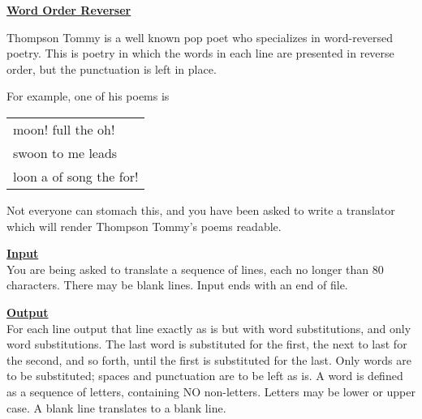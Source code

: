 \documentclass[12pt]{article}
\begin{document}
\newcommand{\problem}[1]{\underline{\Large \bf #1}}
\renewcommand{\section}[1]{\bigskip\underline{\bf #1}\\}
\newcommand{\header}[1]{\underline{\bf #1}}
\setlength{\parindent}{0.0in}
\setlength{\parskip}{1ex}

\problem{Word Order Reverser}

Thompson Tommy is a well known pop poet who specializes
in word-reversed poetry.  This is poetry in which the
words in each line are presented in reverse order, but
the punctuation is left in place.

For example, one of his poems is
\begin{center}\begin{tabular}{l}
moon! full the oh! \\
swoon to me leads \\
loon a of song the for! \\
\end{tabular}\end{center}

Not everyone can stomach this, and you have been asked
to write a translator which will render Thompson Tommy's
poems readable.


\section{Input}
You are being asked to translate a sequence of lines,
each no longer than 80 characters.
There may be blank lines.  Input ends with an end of file.


\section{Output}
For each line output that line exactly as is but with
word substitutions, and only word substitutions.  The
last word is substituted for the first, the next to last
for the second, and so forth, until the first is
substituted for the last.  Only words are to be substituted;
spaces and punctuation are to be left as is.  A word is
defined as a sequence of letters, containing
NO non-letters.  Letters may be lower or upper case.
A blank line translates to a blank
line.
\end{document}
